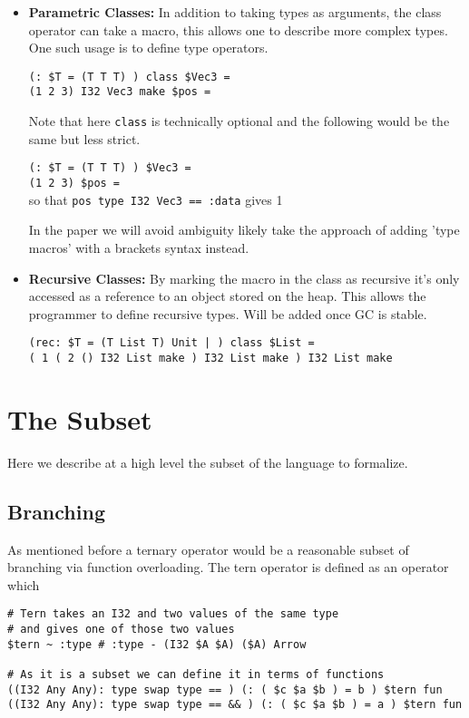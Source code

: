 \documentclass{article}
\begin{document}
\begin{itemize}
\begin{itemize}
        \item \textbf{Parametric Classes:} In addition to taking types as arguments, the class operator can take a macro, this allows one to describe more complex types. One such usage is to define type operators.

        \texttt{(: \$T = (T T T) ) class \$Vec3 =}\\
        \texttt{(1 2 3) I32 Vec3 make \$pos =}

        Note that here \texttt{class} is technically optional and the following would be the same but less strict.

        \texttt{(: \$T = (T T T) ) \$Vec3 =}\\
        \texttt{(1 2 3) \$pos =}\\
        so that \texttt{pos type I32 Vec3 == :data} gives 1

        In the paper we will avoid ambiguity likely take the approach of adding 'type macros' with a brackets syntax instead.

        \item \textbf{Recursive Classes:} By marking the macro in the class as recursive it's only accessed as a reference to an object stored on the heap. This allows the programmer to define recursive types. Will be added once GC is stable.

        \texttt{(rec: \$T = (T List T) Unit | ) class \$List =}\\
        \texttt{( 1 ( 2 () I32 List make ) I32 List make ) I32 List make}
    \end{itemize}
\end{itemize}

\section{The Subset}
Here we describe at a high level the subset of the language to formalize.

\subsection{Branching}
As mentioned before a ternary operator would be a reasonable subset of branching via function overloading. The tern operator is defined as an operator which 

\begin{verbatim}
# Tern takes an I32 and two values of the same type
# and gives one of those two values
$tern ~ :type # :type - (I32 $A $A) ($A) Arrow

# As it is a subset we can define it in terms of functions
((I32 Any Any): type swap type == ) (: ( $c $a $b ) = b ) $tern fun
((I32 Any Any): type swap type == && ) (: ( $c $a $b ) = a ) $tern fun
\end{verbatim}
\end{document}

